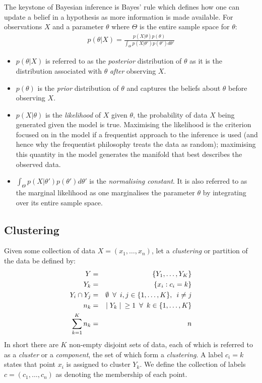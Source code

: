 \documentclass[14pt]{extarticle} %
\begin{document}
	The keystone of Bayesian inference is Bayes' rule which defines how one can update a belief in a hypothesis as more information is made available. For observations $X$ and a parameter $\theta$ where $\Theta$ is the entire sample space for $\theta$:
	\begin{align} \label{Bayes_theorem}
	p(\theta | X) = \frac{p(X | \theta) p(\theta)}{\int_\Theta p(X | \theta ') p(\theta ') d \theta '}
	\end{align}
	\begin{itemize}
		\item $p(\theta | X)$ is referred to as the \emph{posterior} distribution of $\theta$ as it is the distribution associated with $\theta$ \emph{after} observing $X$.
		\item $p(\theta)$ is the \emph{prior} distribution of $\theta$ and captures the beliefs about $\theta$ before observing $X$.
		\item $p(X | \theta)$ is the \emph{likelihood} of $X$ given $\theta$, the probability of data $X$ being generated given the model is true. Maximising the likelihood is the criterion focused on in the model if a frequentist approach to the inference is used (and hence why the frequentist philosophy treats the data as random); maximising this quantity in the model generates the manifold that best describes the observed data. 
		\item $\int_\Theta p(X | \theta ') p(\theta ') d \theta '$ is the \emph{normalising constant}. It is also referred to as the marginal likelihood as one marginalises the parameter $\theta$ by integrating over its entire sample space.
	\end{itemize}
	
	\subsection{Clustering} \label{sec:clustering}
	Given some collection of data $X=\left(x_1,\ldots,x_n\right)$, let a \emph{clustering} or partition of the data be defined by:
	\begin{eqnarray}
	Y &=& \left\{Y_1,\ldots,Y_K\right\} \\
	Y_k &=& \left\{x_i : c_i = k \right\}  \\
	Y_i \cap Y_j &=& \emptyset \enskip \forall \enskip i,j \in \{1,\ldots,K\}, \enskip i \neq j \\
	n_k & = & \mid Y_k \mid \enskip \geq 1 \enskip \forall \enskip k \in \{1,\ldots,K\} \\
	\sum_{k=1}^Kn_k &=& n
	\end{eqnarray}
	In short there are $K$ non-empty disjoint sets of data, each of which is referred to as a \emph{cluster} or a \emph{component}, the set of which form a \emph{clustering}. A label $c_i=k$ states that point $x_i$ is assigned to cluster $Y_k$. We define the collection of labels $c=(c_1,\ldots,c_n)$ as denoting the membership of each point.
	
\end{document}
